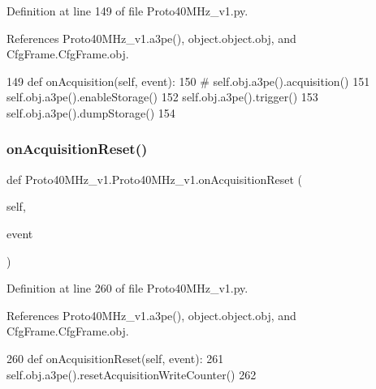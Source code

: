 Definition at line 149 of file Proto40\+M\+Hz\+\_\+v1.\+py.



References Proto40\+M\+Hz\+\_\+v1.\+a3pe(), object.\+object.\+obj, and Cfg\+Frame.\+Cfg\+Frame.\+obj.


\begin{DoxyCode}
149     \textcolor{keyword}{def }onAcquisition(self, event):
150 \textcolor{comment}{#        self.obj.a3pe().acquisition()}
151         self.obj.a3pe().enableStorage()
152         self.obj.a3pe().trigger()
153         self.obj.a3pe().dumpStorage()
154 
\end{DoxyCode}
\mbox{\label{classProto40MHz__v1_1_1Proto40MHz__v1_a64caf487900ebef03ab80ae633f8b59e}} 
\subsubsection{\texorpdfstring{on\+Acquisition\+Reset()}{onAcquisitionReset()}}
{\footnotesize\ttfamily def Proto40\+M\+Hz\+\_\+v1.\+Proto40\+M\+Hz\+\_\+v1.\+on\+Acquisition\+Reset (\begin{DoxyParamCaption}\item[{}]{self,  }\item[{}]{event }\end{DoxyParamCaption})}



Definition at line 260 of file Proto40\+M\+Hz\+\_\+v1.\+py.



References Proto40\+M\+Hz\+\_\+v1.\+a3pe(), object.\+object.\+obj, and Cfg\+Frame.\+Cfg\+Frame.\+obj.


\begin{DoxyCode}
260     \textcolor{keyword}{def }onAcquisitionReset(self, event):
261         self.obj.a3pe().resetAcquisitionWriteCounter()
262 
\end{DoxyCode}
\mbox{\label{classProto40MHz__v1_1_1Proto40MHz__v1_a9cc766ba7ec88bfd62fcb808e9e6a7c3}} 
